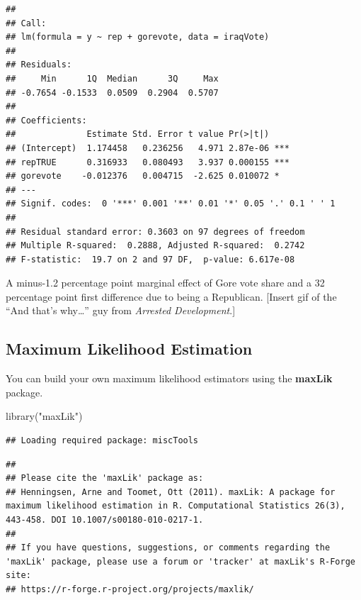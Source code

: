 \documentclass[
  12pt,
  oneside,openany]{book}
\newenvironment{Shaded}{\begin{snugshade}}{\end{snugshade}}
\newcommand{\FunctionTok}[1]{\textcolor[rgb]{0.00,0.00,0.00}{#1}}
\newcommand{\NormalTok}[1]{#1}
\newcommand{\StringTok}[1]{\textcolor[rgb]{0.31,0.60,0.02}{#1}}
\begin{document}
\begin{verbatim}
## 
## Call:
## lm(formula = y ~ rep + gorevote, data = iraqVote)
## 
## Residuals:
##     Min      1Q  Median      3Q     Max 
## -0.7654 -0.1533  0.0509  0.2904  0.5707 
## 
## Coefficients:
##              Estimate Std. Error t value Pr(>|t|)    
## (Intercept)  1.174458   0.236256   4.971 2.87e-06 ***
## repTRUE      0.316933   0.080493   3.937 0.000155 ***
## gorevote    -0.012376   0.004715  -2.625 0.010072 *  
## ---
## Signif. codes:  0 '***' 0.001 '**' 0.01 '*' 0.05 '.' 0.1 ' ' 1
## 
## Residual standard error: 0.3603 on 97 degrees of freedom
## Multiple R-squared:  0.2888, Adjusted R-squared:  0.2742 
## F-statistic:  19.7 on 2 and 97 DF,  p-value: 6.617e-08
\end{verbatim}

A minus-1.2 percentage point marginal effect of Gore vote share and a 32 percentage point first difference due to being a Republican.
{[}Insert gif of the ``And that's why\ldots{}'' guy from \emph{Arrested Development}.{]}

\hypertarget{maximum-likelihood-estimation-1}{%
\subsection{Maximum Likelihood Estimation}\label{maximum-likelihood-estimation-1}}

You can build your own maximum likelihood estimators using the \textbf{maxLik} package.

\begin{Shaded}
\begin{Highlighting}[]
\FunctionTok{library}\NormalTok{(}\StringTok{"maxLik"}\NormalTok{)}
\end{Highlighting}
\end{Shaded}

\begin{verbatim}
## Loading required package: miscTools
\end{verbatim}

\begin{verbatim}
## 
## Please cite the 'maxLik' package as:
## Henningsen, Arne and Toomet, Ott (2011). maxLik: A package for maximum likelihood estimation in R. Computational Statistics 26(3), 443-458. DOI 10.1007/s00180-010-0217-1.
## 
## If you have questions, suggestions, or comments regarding the 'maxLik' package, please use a forum or 'tracker' at maxLik's R-Forge site:
## https://r-forge.r-project.org/projects/maxlik/
\end{verbatim}
\end{document}
